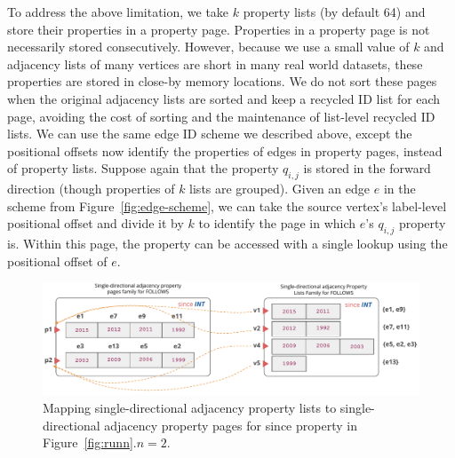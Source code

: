  To address the above limitation, we take $k$ property lists (by default 64) and store their properties in a property page. Properties in a property page is not necessarily stored consecutively. However, because we use a small value of $k$ and adjacency lists of many vertices are short in many real world datasets, these properties are stored in close-by memory locations. We do not sort these pages when the original adjacency lists are sorted and keep a recycled ID list for each page, avoiding the cost of sorting and the maintenance of list-level recycled ID lists. We can use the same edge ID scheme we described above, except the positional offsets now identify the properties of edges in property pages, instead of property lists. Suppose again that the property $q_{i, j}$ is stored in the forward direction (though properties of $k$ lists are grouped). Given an edge $e$ in the scheme from Figure~\ref{fig:edge-scheme}, we can take the source vertex's label-level positional offset and divide it by $k$ to identify the page in which $e$'s $q_{i, j}$ property is. Within this page, the property can be accessed with a single lookup using the positional offset of $e$.


\begin{figure}
	\hfill\includegraphics[scale=0.78]{img/paged}\hspace*{\fill}
	\captionsetup{justification=centering}
	\caption{Mapping single-directional adjacency property lists to single-directional adjacency property pages for since property in Figure~\ref{fig:runn}.$n=2$.}
	\label{fig:paged}
\end{figure}

